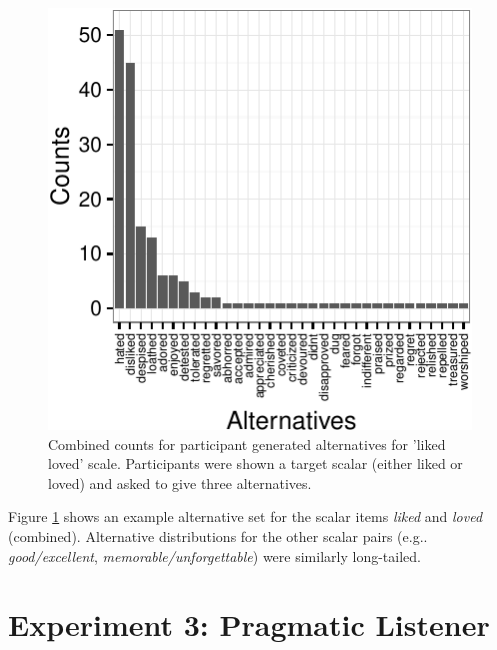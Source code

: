 \documentclass[10pt, letterpaper]{article}
\newenvironment{CodeChunk}{}{}
\begin{document}
\begin{CodeChunk}
\begin{figure}[t]

{\centering \includegraphics{figs/exp2_altsPlot_likedLoved-1} 

}

\caption[Combined counts for participant generated alternatives for 'liked  loved' scale]{Combined counts for participant generated alternatives for 'liked  loved' scale. Participants were shown a target scalar (either liked or loved) and asked to give three alternatives.}\label{fig:exp2_altsPlot_likedLoved}
\end{figure}
\end{CodeChunk}

Figure \ref{fig:exp2_altsPlot_likedLoved} shows an example alternative
set for the scalar items \emph{liked} and \emph{loved} (combined).
Alternative distributions for the other scalar pairs (e.g..
\emph{good/excellent}, \emph{memorable/unforgettable}) were similarly
long-tailed.

\section{Experiment 3: Pragmatic
Listener}\label{experiment-3-pragmatic-listener}
\end{document}
